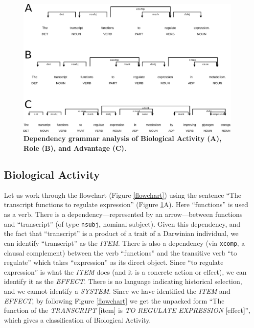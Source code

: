 \documentclass{article}
\begin{document}
\begin{figure}[ht]
  \centering
  \includegraphics[width=\linewidth]{figures/combined_eff_role_adv.png}
  \caption[]{\textbf{Dependency grammar analysis of Biological Activity (A), Role (B), and Advantage (C).}}
  \label{eff_role_adv}
\end{figure}

\subsection{Biological Activity}
\label{sec:biological-activity}

Let us work through the flowchart (Figure \ref{flowchart}) using the sentence ``The transcript functions to regulate expression'' (Figure \ref{eff_role_adv}A).
Here ``functions'' is used as a verb.
There is a dependency---represented by an arrow---between functions and ``transcript'' (of type \texttt{nsubj}, nominal subject).
Given this dependency, and the fact that ``transcript'' is a product of a trait of a Darwinian individual, we can identify ``transcript'' as the \emph{ITEM}.
There is also a dependency (via \texttt{xcomp}, a clausal complement) between the verb ``functions'' and the transitive verb ``to regulate'' which takes ``expression'' as its direct object.
Since ``to regulate expression'' is what the \emph{ITEM} does (and it is a concrete action or effect), we can identify it as the \emph{EFFECT}.
There is no language indicating historical selection, and we cannot identify a \emph{SYSTEM}.
Since we have identified the \emph{ITEM} and \emph{EFFECT}, by following Figure \ref{flowchart} we get the unpacked form ``The function of the \emph{TRANSCRIPT} [item] is \emph{TO REGULATE EXPRESSION} [effect]'', which gives a classification of Biological Activity.
\end{document}
